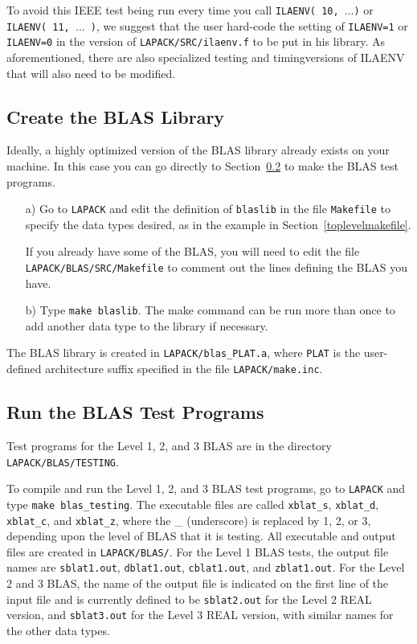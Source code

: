 \documentclass[11pt]{report}
\begin{document}
To avoid this IEEE test being run every time you call
\texttt{ILAENV( 10, $\ldots$)} or \texttt{ILAENV( 11, $\ldots$ )}, we suggest
that the user hard-code the setting of
\texttt{ILAENV=1} or \texttt{ILAENV=0} in the version of \texttt{LAPACK/SRC/ilaenv.f} to be put in
his library.  As aforementioned, there are also specialized testing and
timing\footnotemark[\value{footnote}] versions of ILAENV that will also need to be modified.

\subsection{Create the BLAS Library} 

Ideally, a highly optimized version of the BLAS library already
exists on your machine. 
In this case you can go directly to Section~\ref{testblas} to
make the BLAS test programs.  

\begin{itemize}
\item[a)]
Go to \texttt{LAPACK} and edit the definition of \texttt{blaslib} in the
file \texttt{Makefile} to specify the data types desired, as in the example
in Section~\ref{toplevelmakefile}.

If you already have some of the BLAS, you will need to edit the file
\texttt{LAPACK/BLAS/SRC/Makefile} to comment out the lines 
defining the BLAS you have.  

\item[b)]
Type \texttt{make blaslib}.
The make command can be run more than once to add another
data type to the library if necessary.  
\end{itemize}

\noindent
The BLAS library is created in \texttt{LAPACK/blas\_PLAT.a}, where
\texttt{PLAT} is the user-defined architecture suffix specified in the file
\texttt{LAPACK/make.inc}.

\subsection{Run the BLAS Test Programs}\label{testblas}

Test programs for the Level 1, 2, and 3 BLAS are in the directory 
\texttt{LAPACK/BLAS/TESTING}.

To compile and run the Level 1, 2, and 3 BLAS test programs,
go to \texttt{LAPACK} and type \texttt{make blas\_testing}.  The executable
files are called \texttt{xblat\_s}, \texttt{xblat\_d}, \texttt{xblat\_c}, and
\texttt{xblat\_z}, where the \_ (underscore) is replaced by 1, 2, or 3,
depending upon the level of BLAS that it is testing.  All executable and
output files are created in \texttt{LAPACK/BLAS/}.
For the Level 1 BLAS tests, the output file names are \texttt{sblat1.out},
\texttt{dblat1.out}, \texttt{cblat1.out}, and \texttt{zblat1.out}.  For the Level
2 and 3 BLAS, the name of the output file is indicated on the first line of the
input file and is currently defined to be \texttt{sblat2.out} for
the Level 2 REAL version, and \texttt{sblat3.out} for the Level 3 REAL
version, with similar names for the other data types.
\end{document}

